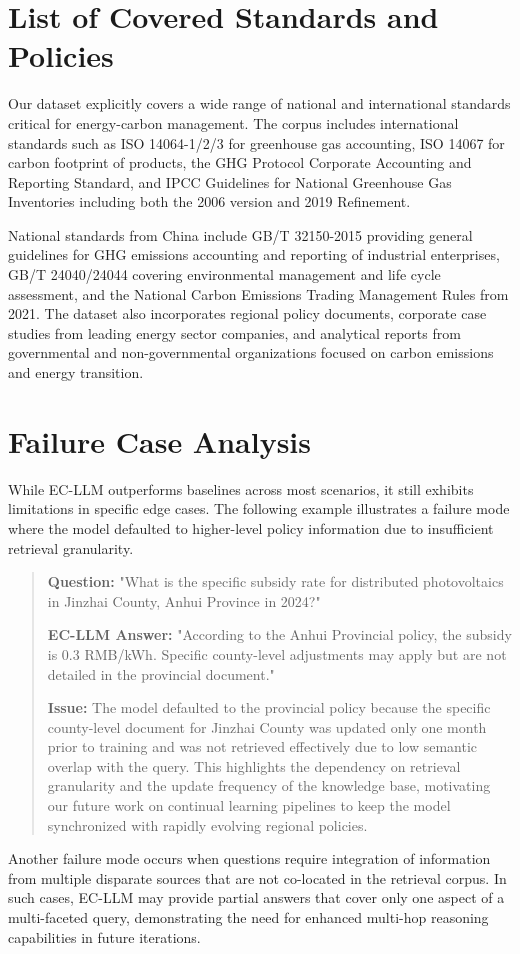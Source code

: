 \documentclass[]{interact}
\theoremstyle{plain}%
\theoremstyle{definition}
\theoremstyle{remark}
\begin{document}
\section{List of Covered Standards and Policies}\label{secA6}

Our dataset explicitly covers a wide range of national and international standards critical for energy-carbon management. The corpus includes international standards such as ISO 14064-1/2/3 for greenhouse gas accounting, ISO 14067 for carbon footprint of products, the GHG Protocol Corporate Accounting and Reporting Standard, and IPCC Guidelines for National Greenhouse Gas Inventories including both the 2006 version and 2019 Refinement.

National standards from China include GB/T 32150-2015 providing general guidelines for GHG emissions accounting and reporting of industrial enterprises, GB/T 24040/24044 covering environmental management and life cycle assessment, and the National Carbon Emissions Trading Management Rules from 2021. The dataset also incorporates regional policy documents, corporate case studies from leading energy sector companies, and analytical reports from governmental and non-governmental organizations focused on carbon emissions and energy transition.

\section{Failure Case Analysis}\label{secA7}

While EC-LLM outperforms baselines across most scenarios, it still exhibits limitations in specific edge cases. The following example illustrates a failure mode where the model defaulted to higher-level policy information due to insufficient retrieval granularity.

\begin{quote}
\textbf{Question:} "What is the specific subsidy rate for distributed photovoltaics in Jinzhai County, Anhui Province in 2024?"

\textbf{EC-LLM Answer:} "According to the Anhui Provincial policy, the subsidy is 0.3 RMB/kWh. Specific county-level adjustments may apply but are not detailed in the provincial document."

\textbf{Issue:} The model defaulted to the provincial policy because the specific county-level document for Jinzhai County was updated only one month prior to training and was not retrieved effectively due to low semantic overlap with the query. This highlights the dependency on retrieval granularity and the update frequency of the knowledge base, motivating our future work on continual learning pipelines to keep the model synchronized with rapidly evolving regional policies.
\end{quote}

Another failure mode occurs when questions require integration of information from multiple disparate sources that are not co-located in the retrieval corpus. In such cases, EC-LLM may provide partial answers that cover only one aspect of a multi-faceted query, demonstrating the need for enhanced multi-hop reasoning capabilities in future iterations.

\relax


\end{document}
